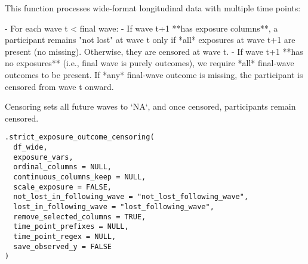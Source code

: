 \documentclass[a4paper]{book}
\begin{document}
%
\begin{Description}
This function processes wide-format longitudinal data with multiple time points:

- For each wave t < final wave:
- If wave t+1 **has exposure columns**, a participant remains "not lost" at wave t
only if *all* exposures at wave t+1 are present (no missing). Otherwise, they are censored at wave t.
- If wave t+1 **has no exposures** (i.e., final wave is purely outcomes),
we require *all* final-wave outcomes to be present. If *any* final-wave outcome is missing,
the participant is censored from wave t onward.

Censoring sets all future waves to `NA`, and once censored, participants remain censored.
\end{Description}
%
\begin{Usage}
\begin{verbatim}
.strict_exposure_outcome_censoring(
  df_wide,
  exposure_vars,
  ordinal_columns = NULL,
  continuous_columns_keep = NULL,
  scale_exposure = FALSE,
  not_lost_in_following_wave = "not_lost_following_wave",
  lost_in_following_wave = "lost_following_wave",
  remove_selected_columns = TRUE,
  time_point_prefixes = NULL,
  time_point_regex = NULL,
  save_observed_y = FALSE
)
\end{verbatim}
\end{Usage}
%
\end{document}
